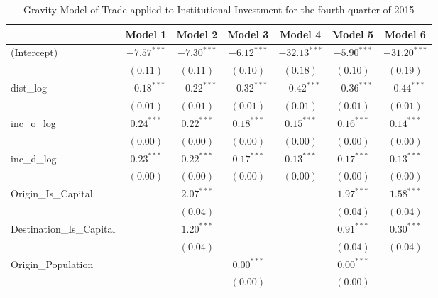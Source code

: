 \begin{table}
	\begin{center}
		\small
		\caption[Gravity Model of trade for Q4 2015]{Gravity Model of Trade applied to Institutional Investment for the fourth quarter of 2015}
		\begin{tabular}{l c c c c c c }
			\hline
			& Model 1 & Model 2 & Model 3 & Model 4 & Model 5 & Model 6 \\
			\hline
			(Intercept)                  & $-7.57^{***}$ & $-7.30^{***}$ & $-6.12^{***}$ & $-32.13^{***}$ & $-5.90^{***}$ & $-31.20^{***}$ \\
			& $(0.11)$      & $(0.11)$      & $(0.10)$      & $(0.18)$       & $(0.10)$      & $(0.19)$       \\
			dist\_log                    & $-0.18^{***}$ & $-0.22^{***}$ & $-0.32^{***}$ & $-0.42^{***}$  & $-0.36^{***}$ & $-0.44^{***}$  \\
			& $(0.01)$      & $(0.01)$      & $(0.01)$      & $(0.01)$       & $(0.01)$      & $(0.01)$       \\
			inc\_o\_log                  & $0.24^{***}$  & $0.22^{***}$  & $0.18^{***}$  & $0.15^{***}$   & $0.16^{***}$  & $0.14^{***}$   \\
			& $(0.00)$      & $(0.00)$      & $(0.00)$      & $(0.00)$       & $(0.00)$      & $(0.00)$       \\
			inc\_d\_log                  & $0.23^{***}$  & $0.22^{***}$  & $0.17^{***}$  & $0.13^{***}$   & $0.17^{***}$  & $0.13^{***}$   \\
			& $(0.00)$      & $(0.00)$      & $(0.00)$      & $(0.00)$       & $(0.00)$      & $(0.00)$       \\
			Origin\_Is\_Capital          &               & $2.07^{***}$  &               &                & $1.97^{***}$  & $1.58^{***}$   \\
			&               & $(0.04)$      &               &                & $(0.04)$      & $(0.04)$       \\
			Destination\_Is\_Capital     &               & $1.20^{***}$  &               &                & $0.91^{***}$  & $0.30^{***}$   \\
			&               & $(0.04)$      &               &                & $(0.04)$      & $(0.04)$       \\
			Origin\_Population           &               &               & $0.00^{***}$  &                & $0.00^{***}$  &                \\
			&               &               & $(0.00)$      &                & $(0.00)$      &                \\

\end{tabular}
\end{center}
\end{table}
